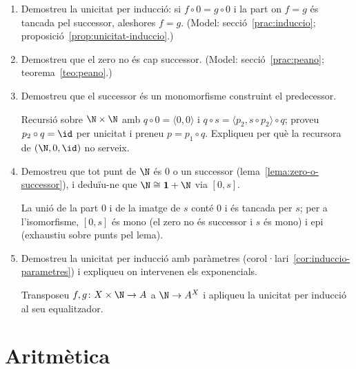 \begin{enumerate}[resume]
  \item Demostreu la unicitat per inducció: si \(f\circ0=g\circ0\) i la part on \(f=g\) és tancada pel successor, aleshores \(f=g\). (Model: secció~\ref{prac:induccio}; proposició~\ref{prop:unicitat-induccio}.)

  \item Demostreu que el zero no és cap successor. (Model: secció~\ref{prac:peano}; teorema~\ref{teo:peano}.)

  \item Demostreu que el successor és un monomorfisme construint el predecessor. \begin{indicacio}Recursió sobre \(\N\times\N\) amb \(q\circ0=\langle0,0\rangle\) i \(q\circ s=\langle p_2,s\circ p_2\rangle\circ q\); proveu \(p_2\circ q=\id\) per unicitat i preneu \(p=p_1\circ q\). Expliqueu per què la recursora de \((\N,0,\id)\) no serveix.\end{indicacio}

  \item Demostreu que tot punt de \(\N\) és \(0\) o un successor (lema~\ref{lema:zero-o-successor}), i deduïu-ne que \(\N\cong\mathbf1+\N\) via \([0,s]\). \begin{indicacio}La unió de la part \(0\) i de la imatge de \(s\) conté \(0\) i és tancada per \(s\); per a l'isomorfisme, \([0,s]\) és mono (el zero no és successor i \(s\) és mono) i epi (exhaustiu sobre punts pel lema).\end{indicacio}

  \item Demostreu la unicitat per inducció amb paràmetres (corol·lari~\ref{cor:induccio-parametres}) i expliqueu on intervenen els exponencials. \begin{indicacio}Transposeu \(f,g\colon X\times\N\to A\) a \(\N\to A^X\) i apliqueu la unicitat per inducció al seu equalitzador.\end{indicacio}
\end{enumerate}

\section{Aritmètica}

